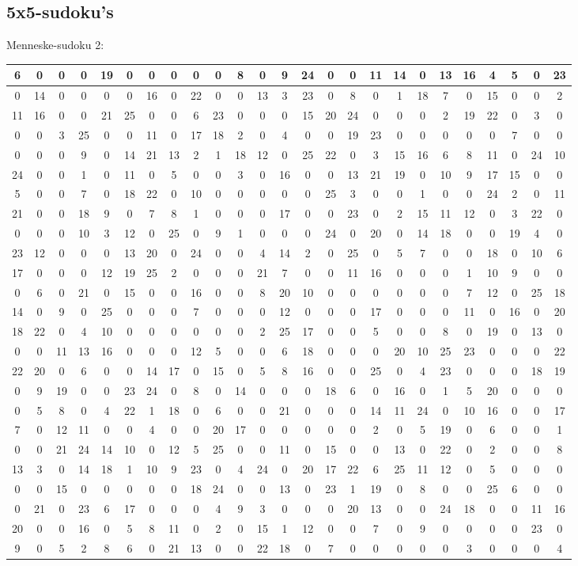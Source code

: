 \documentclass[]{report}
\begin{document}
\subsection{5x5-sudoku's}
Menneske-sudoku 2:\\
\begin{tabular}{|c|c|c|c|c||c|c|c|c|c||c|c|c|c|c||c|c|c|c|c||c|c|c|c|c|}
\hline
6&0&0&0&19&0&0&0&0&0&8&0&9&24&0&0&11&14&0&13&16&4&5&0&23\\\hline
0&14&0&0&0&0&16&0&22&0&0&13&3&23&0&8&0&1&18&7&0&15&0&0&2\\\hline
11&16&0&0&21&25&0&0&6&23&0&0&0&15&20&24&0&0&0&2&19&22&0&3&0\\\hline
0&0&3&25&0&0&11&0&17&18&2&0&4&0&0&19&23&0&0&0&0&0&7&0&0\\\hline
0&0&0&9&0&14&21&13&2&1&18&12&0&25&22&0&3&15&16&6&8&11&0&24&10\\\hline\hline
24&0&0&1&0&11&0&5&0&0&3&0&16&0&0&13&21&19&0&10&9&17&15&0&0\\\hline
5&0&0&7&0&18&22&0&10&0&0&0&0&0&25&3&0&0&1&0&0&24&2&0&11\\\hline
21&0&0&18&9&0&7&8&1&0&0&0&17&0&0&23&0&2&15&11&12&0&3&22&0\\\hline
0&0&0&10&3&12&0&25&0&9&1&0&0&0&24&0&20&0&14&18&0&0&19&4&0\\\hline
23&12&0&0&0&13&20&0&24&0&0&4&14&2&0&25&0&5&7&0&0&18&0&10&6\\\hline\hline
17&0&0&0&12&19&25&2&0&0&0&21&7&0&0&11&16&0&0&0&1&10&9&0&0\\\hline
0&6&0&21&0&15&0&0&16&0&0&8&20&10&0&0&0&0&0&0&7&12&0&25&18\\\hline
14&0&9&0&25&0&0&0&7&0&0&0&12&0&0&0&17&0&0&0&11&0&16&0&20\\\hline
18&22&0&4&10&0&0&0&0&0&0&2&25&17&0&0&5&0&0&8&0&19&0&13&0\\\hline
0&0&11&13&16&0&0&0&12&5&0&0&6&18&0&0&0&20&10&25&23&0&0&0&22\\\hline\hline
22&20&0&6&0&0&14&17&0&15&0&5&8&16&0&0&25&0&4&23&0&0&0&18&19\\\hline
0&9&19&0&0&23&24&0&8&0&14&0&0&0&18&6&0&16&0&1&5&20&0&0&0\\\hline
0&5&8&0&4&22&1&18&0&6&0&0&21&0&0&0&14&11&24&0&10&16&0&0&17\\\hline
7&0&12&11&0&0&4&0&0&20&17&0&0&0&0&0&2&0&5&19&0&6&0&0&1\\\hline
0&0&21&24&14&10&0&12&5&25&0&0&11&0&15&0&0&13&0&22&0&2&0&0&8\\\hline\hline
13&3&0&14&18&1&10&9&23&0&4&24&0&20&17&22&6&25&11&12&0&5&0&0&0\\\hline
0&0&15&0&0&0&0&0&18&24&0&0&13&0&23&1&19&0&8&0&0&25&6&0&0\\\hline
0&21&0&23&6&17&0&0&0&4&9&3&0&0&0&20&13&0&0&24&18&0&0&11&16\\\hline
20&0&0&16&0&5&8&11&0&2&0&15&1&12&0&0&7&0&9&0&0&0&0&23&0\\\hline
9&0&5&2&8&6&0&21&13&0&0&22&18&0&7&0&0&0&0&0&3&0&0&0&4\\\hline
\end{tabular}
\end{document}
